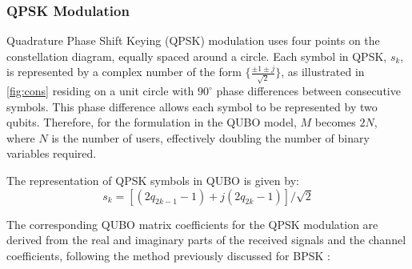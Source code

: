 \subsubsection{QPSK Modulation}
Quadrature Phase Shift Keying (QPSK) modulation uses four points on the constellation diagram, equally spaced around a circle. Each symbol in QPSK, \(s_k\), is represented by a complex number of the form \(\{\frac{\pm1 \pm j}{\sqrt{2}}\}\), as illustrated in \autoref{fig:cons} residing on a unit circle with \(90^\circ\) phase differences between consecutive symbols. This phase difference allows each symbol to be represented by two qubits. Therefore, for the formulation in the QUBO model, \(M\) becomes \(2N\), where \(N\) is the number of users, effectively doubling the number of binary variables required.

The representation of QPSK symbols in QUBO is given by:
\begin{equation}
    s_k = \left[\left(2q_{2k-1}-1\right) + j\left(2q_{2k}-1\right)\right]/\sqrt{2}
\end{equation}



The corresponding QUBO matrix coefficients for the QPSK modulation are derived from the real and imaginary parts of the received signals and the channel coefficients, following the method previously discussed for BPSK \cite{Gabdulsattarov2023}:

